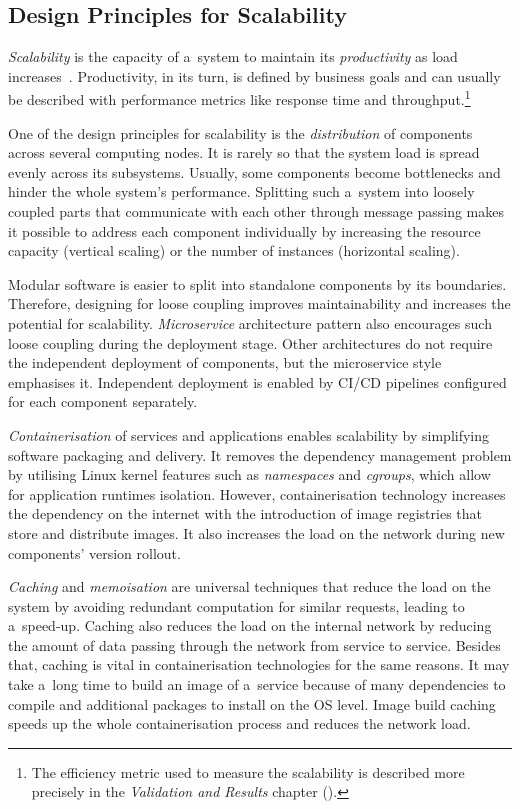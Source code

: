 \documentclass[12pt]{article}
\begin{document}
\subsection{Design Principles for Scalability} \label{ch:scalability_principles}

\emph{Scalability} is the capacity of a~system to maintain its \emph{productivity} as load increases~\cite[p.~289]{daigneau_service_2012}. Productivity, in its turn, is defined by business goals and can usually be described with performance metrics like response time and throughput.\footnote{The efficiency metric used to measure the scalability is described more precisely in the \emph{Validation and Results} chapter ().}

One of the design principles for scalability is the \emph{distribution} of components across several computing nodes. It is rarely so that the system load is spread evenly across its subsystems. Usually, some components become bottlenecks and hinder the whole system's performance. Splitting such a~system into loosely coupled parts that communicate with each other through message passing makes it possible to address each component individually by increasing the resource capacity (vertical scaling) or the number of instances (horizontal scaling). 

Modular software is easier to split into standalone components by its boundaries. Therefore, designing for loose coupling improves maintainability and increases the potential for scalability. \emph{Microservice} architecture pattern also encourages such loose coupling during the deployment stage. Other architectures do not require the independent deployment of components, but the microservice style emphasises it. Independent deployment is enabled by CI/CD pipelines configured for each component separately.

\emph{Containerisation} of services and applications enables scalability by simplifying software packaging and delivery. It removes the dependency management problem by utilising Linux kernel features such as \emph{namespaces} and \emph{cgroups}, which allow for application runtimes isolation. However, containerisation technology increases the dependency on the internet with the introduction of image registries that store and distribute images. It also increases the load on the network during new components' version rollout.

\emph{Caching} and \emph{memoisation} are universal techniques that reduce the load on the system by avoiding redundant computation for similar requests, leading to a~speed-up. Caching also reduces the load on the internal network by reducing the amount of data passing through the network from service to service. Besides that, caching is vital in containerisation technologies for the same reasons. It may take a~long time to build an image of a~service because of many dependencies to compile and additional packages to install on the OS level. Image build caching speeds up the whole containerisation process and reduces the network load.
\end{document}
